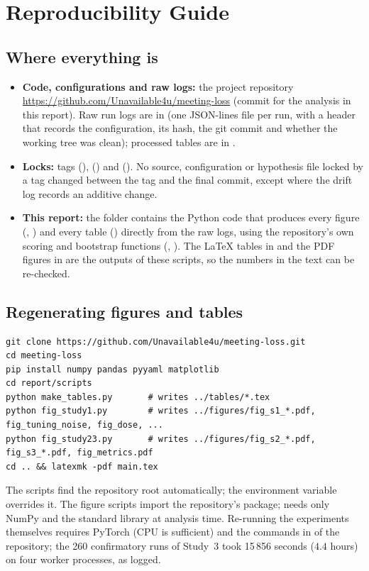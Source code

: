\chapter{Reproducibility Guide}\label{app:reproducibility}

\section{Where everything is}
\begin{itemize}
\item \textbf{Code, configurations and raw logs:} the project repository \url{https://github.com/Unavailable4u/meeting-loss} (commit \code{\repocommit} for the analysis in this report). Raw run logs are in  (one JSON-lines file per run, with a header that records the configuration, its hash, the git commit and whether the working tree was clean); processed tables are in .
\item \textbf{Locks:} tags  (),  () and  (). No source, configuration or hypothesis file locked by a tag changed between the tag and the final commit, except where the drift log records an additive change.
\item \textbf{This report:} the  folder contains the Python code that produces every figure (, ) and every table () directly from the raw logs, using the repository's own scoring and bootstrap functions (, ). The \LaTeX{} tables in  and the PDF figures in  are the outputs of these scripts, so the numbers in the text can be re-checked.
\end{itemize}

\section{Regenerating figures and tables}
\begin{lstlisting}
git clone https://github.com/Unavailable4u/meeting-loss.git
cd meeting-loss
pip install numpy pandas pyyaml matplotlib
cd report/scripts
python make_tables.py       # writes ../tables/*.tex
python fig_study1.py        # writes ../figures/fig_s1_*.pdf, fig_tuning_noise, fig_dose, ...
python fig_study23.py       # writes ../figures/fig_s2_*.pdf, fig_s3_*.pdf, fig_metrics.pdf
cd .. && latexmk -pdf main.tex
\end{lstlisting}
The scripts find the repository root automatically; the environment variable  overrides it.
The figure scripts import the repository's  package;  needs only NumPy and the standard library at analysis time. Re-running the experiments themselves requires PyTorch (CPU is sufficient) and the commands in  of the repository; the 260 confirmatory runs of Study~3 took 15\,856 seconds ($4.4$ hours) on four worker processes, as logged.

